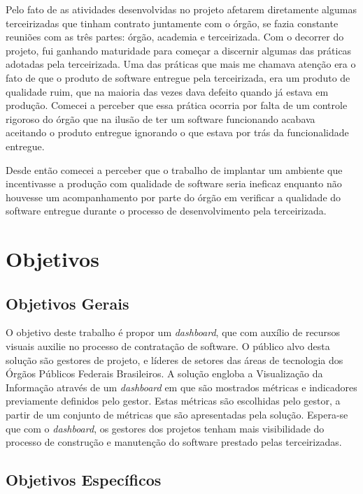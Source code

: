 	Pelo fato de as atividades desenvolvidas no projeto afetarem diretamente algumas terceirizadas que tinham contrato juntamente com o órgão, se fazia constante reuniões com as três partes: órgão, academia e terceirizada. Com o decorrer do projeto, fui ganhando maturidade para começar a discernir algumas das práticas adotadas pela terceirizada. Uma das práticas que mais me chamava atenção era o fato de que o produto de software entregue pela terceirizada, era um produto de qualidade ruim, que na maioria das vezes dava defeito quando já estava em produção. Comecei a perceber que essa prática ocorria por falta de um controle rigoroso do órgão que na ilusão de ter um software funcionando acabava aceitando o produto entregue ignorando o que estava por trás da funcionalidade entregue. 
	
	Desde então comecei a perceber que o trabalho de implantar um ambiente que incentivasse a produção com qualidade de software seria ineficaz enquanto não houvesse um acompanhamento por parte do órgão em verificar a qualidade do software entregue durante o processo de desenvolvimento pela terceirizada.


	\section{Objetivos}

	\subsection{Objetivos Gerais} %
	\label{sub:objetivos_gerais}
	
	O objetivo deste trabalho é propor um \textit{dashboard}, que com auxílio de recursos visuais auxilie no processo de contratação de software. O público alvo desta solução são gestores de projeto, e líderes de setores das áreas de tecnologia dos Órgãos Públicos Federais Brasileiros. A solução engloba a Visualização da Informação através de um \textit{dashboard} em que são mostrados métricas e indicadores previamente definidos pelo gestor. Estas métricas são escolhidas pelo gestor, a partir de um conjunto de métricas que são apresentadas pela solução. Espera-se que com o \textit{dashboard}, os gestores dos projetos tenham mais visibilidade do processo de construção e manutenção do software prestado pelas terceirizadas.


	\subsection{Objetivos Específicos} %
	\label{sub:objetivos_específicos}

